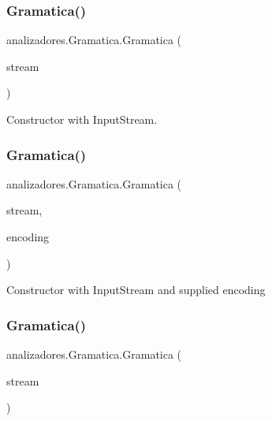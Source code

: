 \subsubsection{\texorpdfstring{Gramatica()}{Gramatica()}\hspace{0.1cm}{\footnotesize\ttfamily [1/4]}}
{\footnotesize\ttfamily analizadores.\+Gramatica.\+Gramatica (\begin{DoxyParamCaption}\item[{java.\+io.\+Input\+Stream}]{stream }\end{DoxyParamCaption})}

Constructor with Input\+Stream. \mbox{\label{classanalizadores_1_1_gramatica_ad399a661121ef126e864fd65af3e290a}} 
\subsubsection{\texorpdfstring{Gramatica()}{Gramatica()}\hspace{0.1cm}{\footnotesize\ttfamily [2/4]}}
{\footnotesize\ttfamily analizadores.\+Gramatica.\+Gramatica (\begin{DoxyParamCaption}\item[{java.\+io.\+Input\+Stream}]{stream,  }\item[{String}]{encoding }\end{DoxyParamCaption})}

Constructor with Input\+Stream and supplied encoding \mbox{\label{classanalizadores_1_1_gramatica_aa27ae694010ecb86720e64791da67ad5}} 
\subsubsection{\texorpdfstring{Gramatica()}{Gramatica()}\hspace{0.1cm}{\footnotesize\ttfamily [3/4]}}
{\footnotesize\ttfamily analizadores.\+Gramatica.\+Gramatica (\begin{DoxyParamCaption}\item[{java.\+io.\+Reader}]{stream }\end{DoxyParamCaption})}

